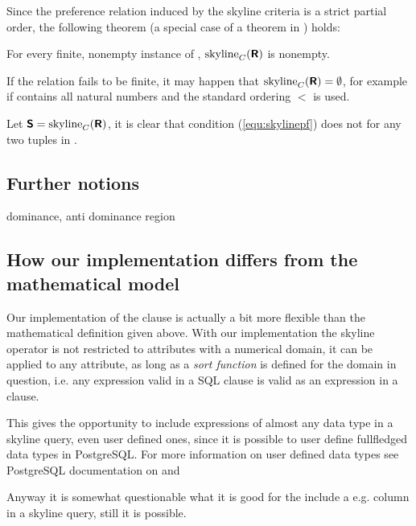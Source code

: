 Since the preference relation induced by the skyline criteria is a strict partial order, the following theorem (a special case of a theorem in \citep{Chomicki2002}) holds:

\begin{theorem}\label{theorem:nonempty}
For every finite, nonempty instance  of , $\skyline_C(\relation{R})$ is nonempty.
\end{theorem}
If the relation  fails to be finite, it may happen that $\skyline_C(\relation{R}) = \emptyset$, for example if  contains all natural numbers and the standard ordering $<$ is used.


\begin{lemma}
Let $\relation{S} = \skyline_C(\relation{R})$, it is clear that condition (\ref{equ:skylinepf}) does not for any two tuples in .
\end{lemma}


\subsection{Further notions}
dominance, anti dominance region

\subsection{How our implementation differs from the mathematical model}
Our implementation of the  clause is actually a bit more flexible than the mathematical definition given above. With our implementation the skyline operator is not restricted to attributes with a numerical domain, it can be applied to any attribute, as long as a \emph{sort function} is defined for the domain in question, i.e.\/ any expression valid in a SQL  clause is valid as an expression in a  clause.

This gives the opportunity to include expressions of almost any data type in a skyline query, even user defined ones, since it is possible to user define fullfledged data types in PostgreSQL. For more information on user defined data types see PostgreSQL documentation on  and 

Anyway it is somewhat questionable what it is good for the include a e.g.  column in a skyline query, still it is possible.

